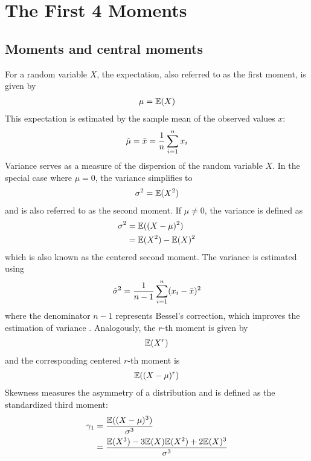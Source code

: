 \section{The First 4 Moments}
\label{sec:moments}

\subsection{Moments and central moments}

For a random variable $X$, the expectation, also referred to as the first moment, is given by
\begin{align}
    \mu = \mathbb{E}(X)\notag
\end{align}
This expectation is estimated by the sample mean of the observed values $x$:
\begin{align}
    \hat{\mu} = \bar{x} = \frac{1}{n}\sum_{i=1}^{n}x_i\notag
\end{align}
Variance serves as a measure of the dispersion of the random variable $X$. In the special case where $\mu = 0$, the variance simplifies to
\begin{align}
    \sigma^2 = \mathbb{E}(X^2)\notag
\end{align}
and is also referred to as the second moment. If $\mu \neq 0$, the variance is defined as
\begin{align}
    \label{eq:definition_variance}
    \sigma^2 &= \mathbb{E}((X-\mu)^2) \\
    &= \mathbb{E}(X^2) - \mathbb{E}(X)^2 \notag
\end{align}
which is also known as the centered second moment. The variance is estimated using
\begin{align}
    \hat{\sigma}^2 = \frac{1}{n-1}\sum_{i=1}^{n}(x_i-\bar{x})^2\notag
\end{align}
where the denominator $n-1$ represents Bessel's correction, which improves the estimation of variance \cite{radziwillStatisticsEasierWay2017}. Analogously, the $r$-th moment is given by
\begin{align}
    \mathbb{E}(X^r)\notag
\end{align}
and the corresponding centered $r$-th moment is
\begin{align}
    \mathbb{E}((X-\mu)^r)\notag
\end{align}
Skewness measures the asymmetry of a distribution and is defined as the standardized third moment:
\begin{align}
    \label{eq:definition_skewness}
    \gamma_1 &= \frac{\mathbb{E}((X-\mu)^3)}{\sigma^3} \\
    &= \frac{\mathbb{E}(X^3) - 3\mathbb{E}(X)\mathbb{E}(X^2) + 2\mathbb{E}(X)^3}{\sigma^3} \notag
\end{align}
